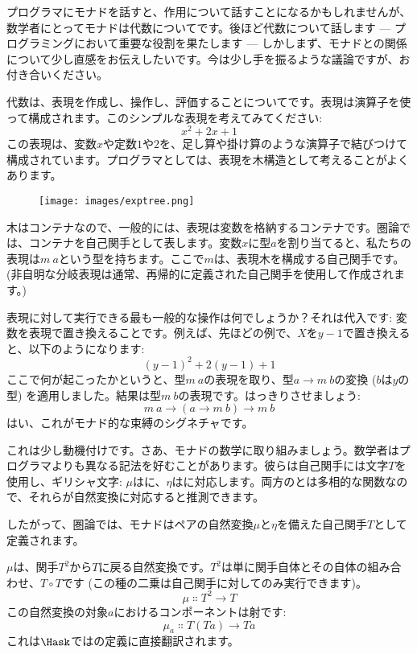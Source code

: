 
\lettrine[lhang=0.17]{プ}{ログラマ}にモナドを話すと、作用について話すことになるかもしれませんが、数学者にとってモナドは代数についてです。後ほど代数について話します --- プログラミングにおいて重要な役割を果たします --- しかしまず、モナドとの関係について少し直感をお伝えしたいです。今は少し手を振るような議論ですが、お付き合いください。

代数は、表現を作成し、操作し、評価することについてです。表現は演算子を使って構成されます。このシンプルな表現を考えてみてください: 
\[x^2 + 2 x + 1\]
この表現は、変数$x$や定数$1$や$2$を、足し算や掛け算のような演算子で結びつけて構成されています。プログラマとしては、表現を木構造として考えることがよくあります。

\begin{figure}[H]
  \centering
  \texttt{[image: images/exptree.png]}
\end{figure}

\noindent
木はコンテナなので、一般的には、表現は変数を格納するコンテナです。圏論では、コンテナを自己関手として表します。変数$x$に型$a$を割り当てると、私たちの表現は$m\ a$という型を持ちます。ここで$m$は、表現木を構成する自己関手です。(非自明な分岐表現は通常、再帰的に定義された自己関手を使用して作成されます。)

表現に対して実行できる最も一般的な操作は何でしょうか？それは代入です: 変数を表現で置き換えることです。例えば、先ほどの例で、$X$を$y - 1$で置き換えると、以下のようになります: 
\[(y - 1)^2 + 2 (y - 1) + 1\]
ここで何が起こったかというと、型$m\ a$の表現を取り、型$a \to m\ b$の変換 ($b$は$y$の型) を適用しました。結果は型$m\ b$の表現です。はっきりさせましょう: 
\[m\ a \to (a \to m\ b) \to m\ b\]
はい、これがモナド的な束縛のシグネチャです。

これは少し動機付けです。さあ、モナドの数学に取り組みましょう。数学者はプログラマよりも異なる記法を好むことがあります。彼らは自己関手には文字$T$を使用し、ギリシャ文字: $\mu$はに、$\eta$はに対応します。両方のとは多相的な関数なので、それらが自然変換に対応すると推測できます。

したがって、圏論では、モナドはペアの自然変換$\mu$と$\eta$を備えた自己関手$T$として定義されます。

$\mu$は、関手$T^2$から$T$に戻る自然変換です。$T^2$は単に関手自体とその自体の組み合わせ、$T \circ T$です (この種の二乗は自己関手に対してのみ実行できます)。
\[\mu \Colon T^2 \to T\]
この自然変換の対象$a$におけるコンポーネントは射です: 
\[\mu_a \Colon T (T a) \to T a\]
これは$\Hask$ではの定義に直接翻訳されます。


